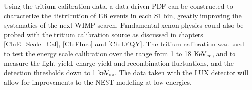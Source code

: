 Using the tritium calibration data, a data-driven PDF can be constructed to characterize the distribution of ER events in each S1 bin, greatly improving the systematics of the next WIMP search. Fundamental xenon physics could also be probed with the tritium calibration source as discussed in chapters \ref{Ch:E_Scale_Cal}, \ref{Ch:Flucs} and \ref{Ch:LYQY}. The tritium calibration was used to test the energy scale calibration over the range from 1 to 18 $\rm KeV_{ee}$, and to measure the light yield, charge yield and recombination fluctuations, and the detection thresholds down to 1 $\rm keV_{ee}$. The data taken with the LUX detector will allow for improvements to the NEST modeling at low energies. 


